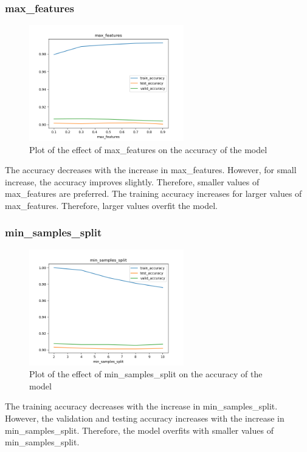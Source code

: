 \documentclass[11pt]{article}
\begin{document}
\subsubsection{max\_features}
\begin{figure}[H]
  \centering
  \includegraphics[width=0.6\textwidth]{Q1/output/d_m.png}
  \caption{Plot of the effect of max\_features on the accuracy of the model}
\end{figure}
The accuracy decreases with the increase in max\_features. However, for small increase, the accuracy improves slightly. Therefore, smaller values of max\_features are preferred. The training accuracy increases for larger values of max\_features. Therefore, larger values overfit the model.

\subsubsection{min\_samples\_split}
\begin{figure}[H]
  \centering
  \includegraphics[width=0.6\textwidth]{Q1/output/d_s.png}
  \caption{Plot of the effect of min\_samples\_split on the accuracy of the model}
\end{figure}
The training accuracy decreases with the increase in min\_samples\_split. However, the validation and testing accuracy increases with the increase in min\_samples\_split. Therefore, the model overfits with smaller values of min\_samples\_split.
\end{document}
